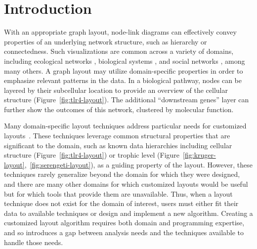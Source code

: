 \section{Introduction}
With an appropriate graph layout, node-link diagrams can
effectively convey properties of an underlying
network structure, such as hierarchy or connectedness. Such visualizations
are common across a variety of domains, including ecological networks
\cite{hinke2004visualizing,harper2006dynamic,lavigne1996cod,baskerville2011spatial,yodzis1998local,cohen2003ecological,kearney2016blog,benson2016higher,kruger2017},
biological systems
\cite{barsky2008cerebral,shannon2003cytoscape,gehlenborg2010visualization,saraiya2005visualizing,becker2001graph,kojima2007efficient,li2005grid},
and social networks
\cite{scott1988social,rothenberg1998using,fitzpatrick2001preventable,mcelroy2003network,fu2011hiv}, 
among many others. A graph layout may utilize
domain-specific properties in order to emphasize relevant patterns in the
data. 
In a biological pathway, nodes can be layered by their
subcellular location to provide an overview of the cellular structure
(Figure~\ref{fig:tlr4-layout}). The additional ``downstream genes'' layer
can further show the outcomes of this network, clustered by molecular function.

\tlrfourLayout

Many domain-specific layout techniques address particular needs
for customized layouts~\cite{barsky2008cerebral,genc2003constrained,shannon2003cytoscape,kearney2017d3,kearney2017ecopath}. These
techniques leverage common structural properties that are significant to the
domain, such as known data hierarchies including cellular 
structure (Figure~\ref{fig:tlr4-layout}) or trophic level
(Figure~\ref{fig:kruger-layout},~\ref{fig:serengeti-layout}), as a guiding property of the
layout. However, these techniques rarely generalize beyond the domain for
which they were designed, and there are many
other domains for which customized layouts would be useful
but for which tools that provide them are unavailable.
Thus, when a layout technique does not exist for the
domain of interest, users must either fit their data
to available techniques or design and implement a new algorithm.
Creating a customized layout algorithm requires both
domain and programming expertise, and so introduces a gap between 
analysis needs and the techniques available to handle those needs.

